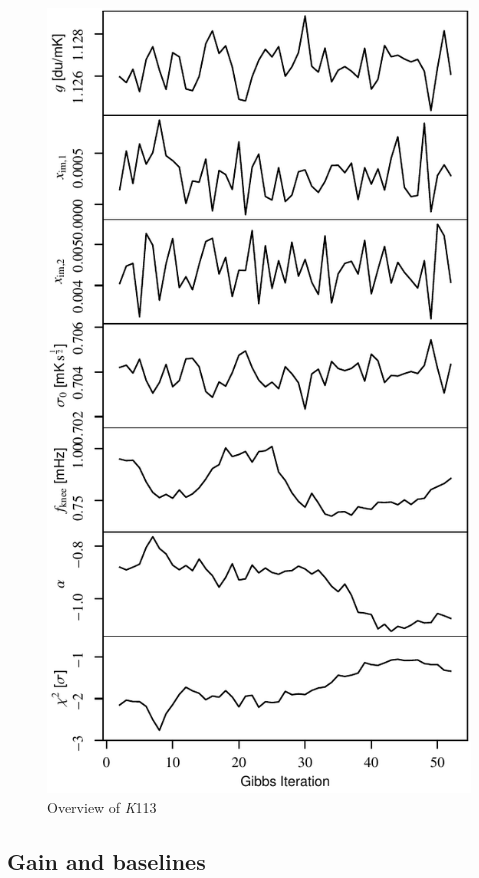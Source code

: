 \documentclass[twocolumn]{../../common/aa}
\newcommand{\K}[0]{\textit K}
\begin{document}
\begin{figure}[t]
  	\centering
	\includegraphics[width=\linewidth]{figures/instpar_CG_K113_samples_v1.pdf}
	\caption{Overview of \K113}
	\label{fig:inst_K113}
\end{figure}



\subsection{Gain and baselines}
\label{sec:gain}
\end{document}

